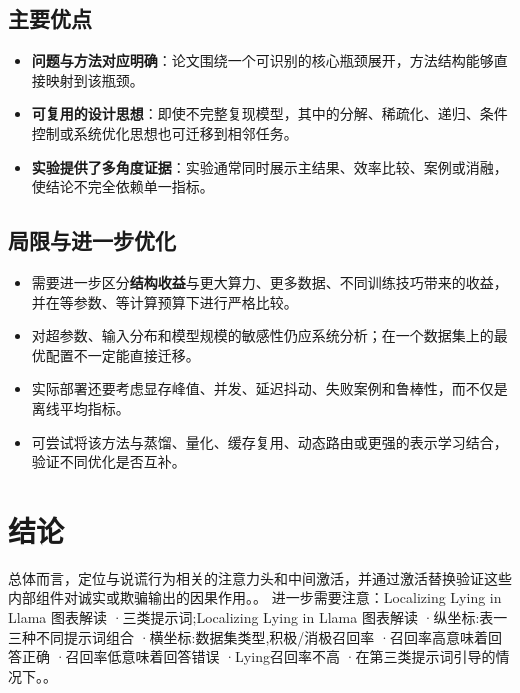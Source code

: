 \documentclass[UTF8,11pt,a4paper]{ctexart}
\newcommand{\term}[1]{\textbf{\textcolor{mainblue}{#1}}}
\begin{document}
\subsection{主要优点}
\begin{itemize}
\item \term{问题与方法对应明确}：论文围绕一个可识别的核心瓶颈展开，方法结构能够直接映射到该瓶颈。
\item \term{可复用的设计思想}：即使不完整复现模型，其中的分解、稀疏化、递归、条件控制或系统优化思想也可迁移到相邻任务。
\item \term{实验提供了多角度证据}：实验通常同时展示主结果、效率比较、案例或消融，使结论不完全依赖单一指标。
\end{itemize}

\subsection{局限与进一步优化}
\begin{itemize}
\item 需要进一步区分\term{结构收益}与更大算力、更多数据、不同训练技巧带来的收益，并在等参数、等计算预算下进行严格比较。
\item 对超参数、输入分布和模型规模的敏感性仍应系统分析；在一个数据集上的最优配置不一定能直接迁移。
\item 实际部署还要考虑显存峰值、并发、延迟抖动、失败案例和鲁棒性，而不仅是离线平均指标。
\item 可尝试将该方法与蒸馏、量化、缓存复用、动态路由或更强的表示学习结合，验证不同优化是否互补。
\end{itemize}

\section{结论}
总体而言，定位与说谎行为相关的注意力头和中间激活，并通过激活替换验证这些内部组件对诚实或欺骗输出的因果作用。。 进一步需要注意：Localizing Lying in Llama 图表解读 ·三类提示词;Localizing Lying in Llama 图表解读 ·纵坐标:表一三种不同提示词组合 ·横坐标:数据集类型,积极/消极召回率 ·召回率高意味着回答正确 ·召回率低意味着回答错误 ·Lying召回率不高 ·在第三类提示词引导的情况下。。
\end{document}
